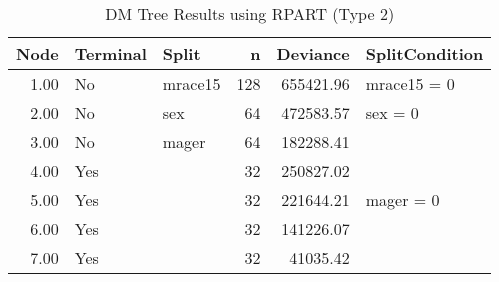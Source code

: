 \begin{landscape}
\begin{table}[htbp]
\centering
\begingroup\normalsize
\begin{tabular}{rllrrl}
  \hline
Node & Terminal & Split & n & Deviance & SplitCondition \\ 
  \hline
1.00 & No & mrace15 & 128 & 655421.96 & mrace15 = 0 \\ 
  2.00 & No & sex &  64 & 472583.57 & sex = 0 \\ 
  3.00 & No & mager &  64 & 182288.41 &  \\ 
  4.00 & Yes &  &  32 & 250827.02 &  \\ 
  5.00 & Yes &  &  32 & 221644.21 & mager = 0 \\ 
  6.00 & Yes &  &  32 & 141226.07 &  \\ 
  7.00 & Yes &  &  32 & 41035.42 &  \\ 
   \hline
\end{tabular}
\endgroup
\caption{DM Tree Results using RPART (Type 2)} 
\label{tab:rpart_results_type2}
\end{table}
\end{landscape}
